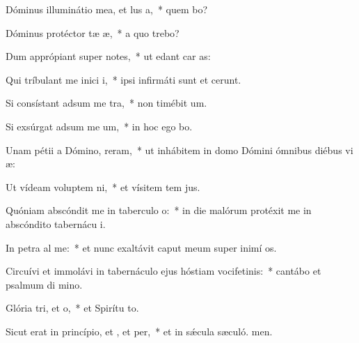 \item Dóminus illuminátio mea, et lus a,~* quem bo?
\item Dóminus protéctor tæ æ,~* a quo trebo?
\item Dum apprópiant super  notes,~* ut edant car as:
\item Qui tríbulant me inici i,~* ipsi infirmáti sunt et cerunt.
\item Si consístant adsum me tra,~* non timébit  um.
\item Si exsúrgat adsum me um,~* in hoc ego bo.
\item Unam pétii a Dómino,  reram,~* ut inhábitem in domo Dómini ómnibus diébus vi æ:
\item Ut vídeam voluptem ni,~* et vísitem tem jus.
\item Quóniam abscóndit me in taberculo o:~* in die malórum protéxit me in abscóndito tabernácu i.
\item In petra al me:~* et nunc exaltávit caput meum super inimí os.
\item Circuívi et immolávi in tabernáculo ejus hóstiam vocifetinis:~* cantábo et psalmum di mino.
\item Glória tri, et o,~* et Spirítu to.
\item Sicut erat in princípio, et , et per,~* et in sǽcula sæculó. men.
